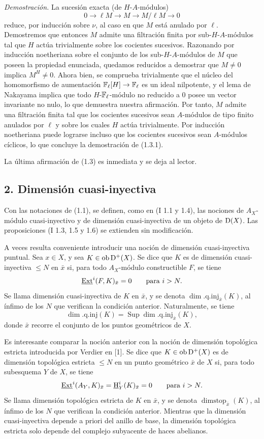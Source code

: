 \emph{Demostración.} La sucesión exacta (de $H$-$A$-módulos)
\[
        0\longrightarrow \ell M\longrightarrow M\longrightarrow M/\ell M\longrightarrow 0
\]
reduce, por inducción sobre $\nu$, al caso en que $M$ está anulado por $\ell$. Demostremos que entonces $M$ admite una filtración finita por sub-$H$-$A$-módulos tal que $H$ actúa trivialmente sobre los cocientes sucesivos. Razonando por inducción noetheriana sobre el conjunto de los sub-$H$-$A$-módulos de $M$ que poseen la propiedad enunciada, quedamos reducidos a demostrar que $M\neq0$ implica $M^H\neq0$. Ahora bien, se comprueba trivialmente que el núcleo del homomorfismo de aumentación $\mathbb{F}_\ell[H]\to\mathbb{F}_\ell$ es un ideal nilpotente, y el lema de Nakayama implica que todo $H$-$\mathbb{F}_\ell$-módulo no reducido a $0$ posee un vector invariante no nulo, lo que demuestra nuestra afirmación. Por tanto, $M$ admite una filtración finita tal que los cocientes sucesivos sean $A$-módulos de tipo finito anulados por $\ell$ y sobre los cuales $H$ actúa trivialmente. Por inducción noetheriana puede lograrse incluso que los cocientes sucesivos sean $A$-módulos cíclicos, lo que concluye la demostración de (1.3.1).

La última afirmación de (1.3) es inmediata y se deja al lector.

\subsection*{2. Dimensión cuasi-inyectiva}

Con las notaciones de (1.1), se definen, como en (I 1.1 y 1.4), las nociones de $A_X$-módulo cuasi-inyectivo y de dimensión cuasi-inyectiva de un objeto de $\mathrm{D}(X)$. Las proposiciones (I 1.3, 1.5 y 1.6) se extienden sin modificación.

A veces resulta conveniente introducir una noción de dimensión cuasi-inyectiva puntual. Sea $x\in X$, y sea $K\in\operatorname{ob} \mathrm{D}^+(X)$. Se dice que $K$ es de dimensión cuasi-inyectiva $\leq N$ en $\bar{x}$ si, para todo $A_X$-módulo constructible $F$, se tiene
\[
        \underline{\operatorname{Ext}}^{i}(F,K)_{\bar{x}}=0\qquad\hbox{para }i>N.
\]
Se llama dimensión cuasi-inyectiva de $K$ en $\bar{x}$, y se denota $\dim.\mathrm{q.inj}_{\bar{x}}(K)$, al ínfimo de los $N$ que verifican la condición anterior. Naturalmente, se tiene
\[
        \dim.\mathrm{q.inj}(K)=\operatorname{Sup}\dim.\mathrm{q.inj}_{\bar{x}}(K),
\]
donde $\bar{x}$ recorre el conjunto de los puntos geométricos de $X$.

Es interesante comparar la noción anterior con la noción de dimensión topológica estricta introducida por Verdier en [1]. Se dice que $K\in\operatorname{ob} \mathrm{D}^+(X)$ es de dimensión topológica estricta $\leq N$ en un punto geométrico $\bar{x}$ de $X$ si, para todo subesquema $Y$ de $X$, se tiene
\[
        \underline{\operatorname{Ext}}^{i}(A_Y,K)_{\bar{x}}=\underline{\mathrm H}^i_Y(K)_{\bar{x}}=0\qquad\hbox{para }i>N.
\]
Se llama dimensión topológica estricta de $K$ en $\bar{x}$, y se denota $\operatorname{dimstop}_{\bar{x}}(K)$, al ínfimo de los $N$ que verifican la condición anterior. Mientras que la dimensión cuasi-inyectiva depende a priori del anillo de base, la dimensión topológica estricta solo depende del complejo subyacente de haces abelianos.

